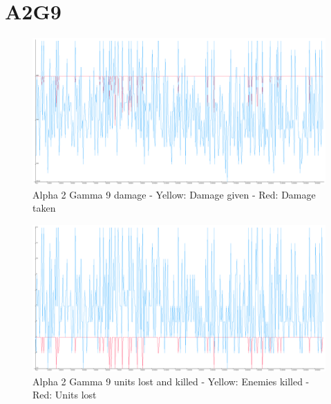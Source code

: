 \section{A2G9}
\begin{figure}[H]
\includegraphics[angle=-90, scale=0.25]{Figures/learningrate/A2G9/damage.png}
\caption{Alpha 2 Gamma 9 damage - Yellow: Damage given - Red: Damage taken}
\label{fig:app_a2g9_damage}
\end{figure}	

\begin{figure}[H]
\includegraphics[angle=-90, scale=0.25]{Figures/learningrate/A2G9/units_lost_and_units_killed.png}
\caption{Alpha 2 Gamma 9 units lost and killed - Yellow: Enemies killed - Red: Units lost}
\label{fig:app_a2g9_lak}
\end{figure}	

\newpage
